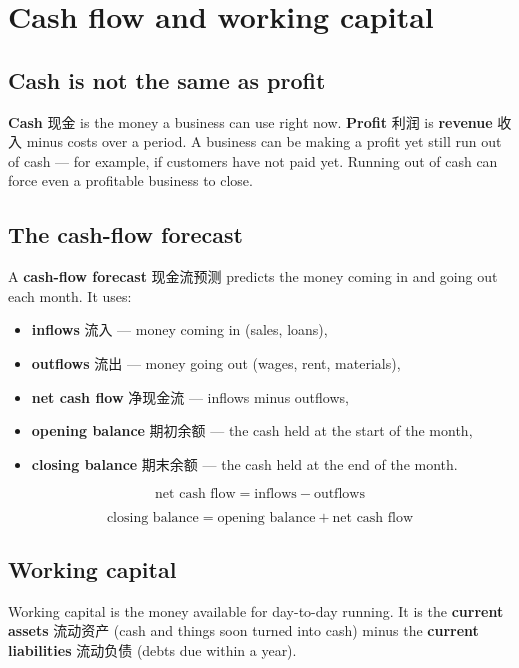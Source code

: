 \documentclass[11pt]{article}
\begin{document}
\section*{Cash flow and working capital}

\subsection*{Cash is not the same as profit}

\textbf{Cash} 现金 is the money a business can use right now. \textbf{Profit} 利润 is \textbf{revenue} 收入 minus costs over a period. A business can be making a profit yet still run out of cash — for example, if customers have not paid yet. Running out of cash can force even a profitable business to close.

\subsection*{The cash-flow forecast}

A \textbf{cash-flow forecast} 现金流预测 predicts the money coming in and going out each month. It uses:

\begin{itemize}
\item \textbf{inflows} 流入 — money coming in (sales, loans),

\item \textbf{outflows} 流出 — money going out (wages, rent, materials),

\item \textbf{net cash flow} 净现金流 — inflows minus outflows,

\item \textbf{opening balance} 期初余额 — the cash held at the start of the month,

\item \textbf{closing balance} 期末余额 — the cash held at the end of the month.

\end{itemize}

\[
\text{net cash flow} = \text{inflows} - \text{outflows}
\]

\[
\text{closing balance} = \text{opening balance} + \text{net cash flow}
\]

\subsection*{Working capital}

Working capital is the money available for day-to-day running. It is the \textbf{current assets} 流动资产 (cash and things soon turned into cash) minus the \textbf{current liabilities} 流动负债 (debts due within a year).
\end{document}
